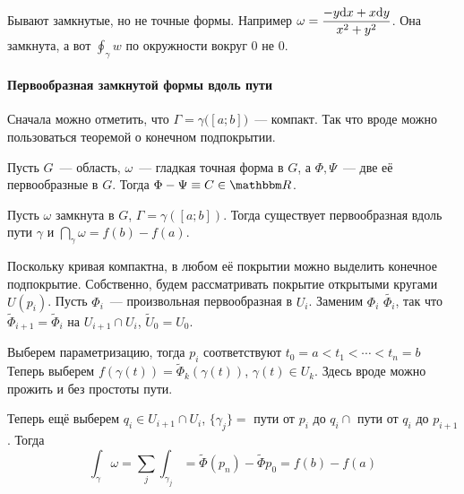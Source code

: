\documentclass[12pt,timbord]{../../../notes}
\begin{document}
\begin{rem}
  Бывают замкнутые, но не точные формы. Например $\omega = \dfrac{-y \mathrm{d} x + x \mathrm{d} y}{x^2 +
  y^2}$. Она замкнута, а вот $\oint_\gamma w$ по окружности вокруг $0$ не 0.
\end{rem}

\paragraph{ \underdev Первообразная замкнутой формы вдоль пути}
\label{par:lineint::closintpath}

Сначала можно отметить, что $\Gamma = \gamma\bigl([a;b]\bigr)$~--- компакт. Так что вроде можно
пользоваться теоремой о конечном подпокрытии.
\begin{lem}\label{thrm:lineint::closintpath::potdiff}
    Пусть $G$~--- область, $\omega$~--- гладкая точная форма в $G$, 
    а $\Phi, \Psi$~--- две её первообразные в $G$. Тогда $\Phi-\Psi\equiv C\in \R$.
\end{lem}

\begin{thrm}\label{thrm:lineint::closintpath}
  Пусть $\omega$ замкнута в $G$, $\Gamma=\gamma([a;b])$. Тогда существует первообразная вдоль пути
  $\gamma$ и  $\dint_\gamma \omega = f(b) - f(a)$.
\end{thrm}

\begin{ittproof}
  Поскольку кривая компактна, в любом её покрытии можно выделить конечное подпокрытие. Собственно,
  будем рассматривать покрытие открытыми кругами $U(p_i)$. Пусть $\Phi_i$~--- произвольная
  первообразная в $U_i$. Заменим $\Phi_i$ $\widetilde{\Phi_i}$, так что 
  $\widetilde{\Phi}_{i+1}= \widetilde{\Phi}_{i}$ на $U_{i+1} \cap U_i$, $\widetilde{U}_0=U_0$.

  Выберем параметризацию, тогда $p_i$  соответствуют $t_0=a< t_1 <\cdots < t_n = b$
  Теперь выберем $f(\gamma(t)) = \widetilde{\Phi}_k(\gamma(t))$, $\gamma(t) \in U_k$.
  Здесь вроде можно прожить и без простоты пути.

  Теперь ещё выберем $q_i \in U_{i+1} \cap U_i$, $\{\gamma_j\} =$ пути от $ p_i$ до $q_i \cap$
  пути от $q_i$ до $p_{i+1}$. Тогда
  \[
    \int _\gamma \omega = \sum_j\int_{\gamma_j} =  \widetilde{\Phi}(p_n) - \widetilde{\Phi}{p_0} =
    f(b) - f(a)
  \]
\end{ittproof}
\end{document}
